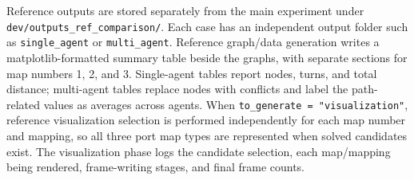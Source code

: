\documentclass[11pt]{article}
\begin{document}
Reference outputs are stored separately from the main experiment under \texttt{dev/outputs\_ref\_comparison/}. Each case has an independent output folder such as \texttt{single\_agent} or \texttt{multi\_agent}. Reference graph/data generation writes a matplotlib-formatted summary table beside the graphs, with separate sections for map numbers 1, 2, and 3. Single-agent tables report nodes, turns, and total distance; multi-agent tables replace nodes with conflicts and label the path-related values as averages across agents. When \texttt{to\_generate = "visualization"}, reference visualization selection is performed independently for each map number and mapping, so all three port map types are represented when solved candidates exist. The visualization phase logs the candidate selection, each map/mapping being rendered, frame-writing stages, and final frame counts.
\end{document}
